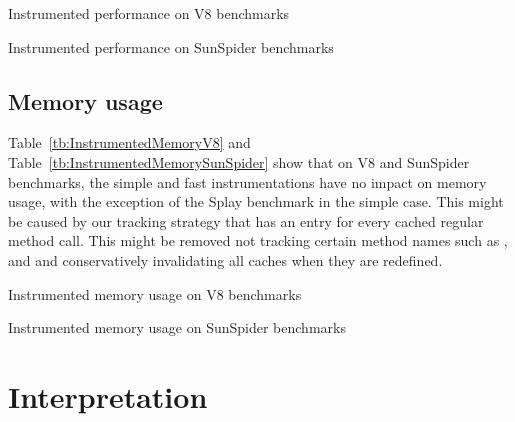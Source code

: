 \begin{table}[htb]
\caption{Instrumented performance on V8 benchmarks}
\centering
    
\label{tb:InstrumentedPerformanceV8}
\end{table}


\begin{table}[htb]
\caption{Instrumented performance on SunSpider benchmarks}
\centering
    
\label{tb:InstrumentedPerformanceSunSpider}
\end{table}

\subsection{Memory usage}

Table~\ref{tb:InstrumentedMemoryV8} and
Table~\ref{tb:InstrumentedMemorySunSpider} show that on V8 and SunSpider
benchmarks, the simple and fast instrumentations have no impact on memory
usage, with the exception of the Splay benchmark in the simple case.  This might
be caused by our tracking strategy that has an entry for every cached regular
method call. This might be removed not tracking certain method names such as
,  and  and conservatively invalidating
all caches when they are redefined.

\begin{table}[htb]
\caption{Instrumented memory usage on V8 benchmarks}
\centering
    
\label{tb:InstrumentedMemoryV8}
\end{table}

\begin{table}[htb]
\caption{Instrumented memory usage on SunSpider benchmarks}
\centering
    
\label{tb:InstrumentedMemorySunSpider}
\end{table}


\section{Interpretation}


